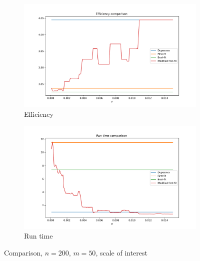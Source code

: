 \documentclass{amsart}
\begin{document}
\begin{figure}[!h]
    \centering
    \begin{subfigure}[b]{0.495\textwidth}
        \centering
        \includegraphics[width=1.1\textwidth]{plots/efficiency small scale p.pdf}
        \caption{Efficiency}
    \end{subfigure}
    \hfill
    \begin{subfigure}[b]{0.495\textwidth}
        \centering
        \includegraphics[width=1.1\textwidth]{plots/RUN TIME p small scale.pdf}
        \caption{Run time}
    \end{subfigure}
    \caption{Comparison, $n=200$, $m=50$, scale of interest}
    \label{p small scale}
\end{figure}

\clearpage
\end{document}

